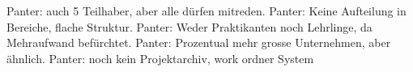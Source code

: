 Panter: auch 5 Teilhaber, aber alle dürfen mitreden.
Panter: Keine Aufteilung in Bereiche, flache Struktur.
Panter: Weder Praktikanten noch Lehrlinge, da Mehraufwand befürchtet.
Panter: Prozentual mehr grosse Unternehmen, aber ähnlich.
Panter: noch kein Projektarchiv, work ordner System
